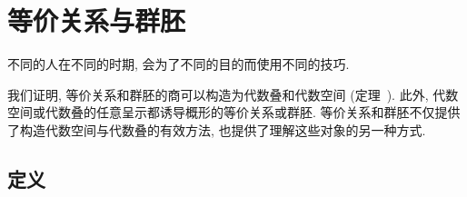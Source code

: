 \section{等价关系与群胚}\label{src:4.4-section}
\begin{epigraph}
不同的人在不同的时期, 会为了不同的目的而使用不同的技巧.
\end{epigraph}
我们证明, 等价关系和群胚的商可以构造为代数叠和代数空间 (定理~). 此外, 代数空间或代数叠的任意呈示都诱导概形的等价关系或群胚. 等价关系和群胚不仅提供了构造代数空间与代数叠的有效方法, 也提供了理解这些对象的另一种方式.
\subsection{定义}\label{src:4.4.1-subsection}
